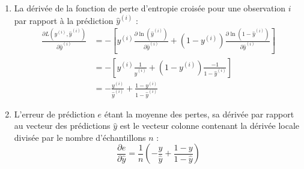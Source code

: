 \documentclass[]{../exercices}
\begin{document}
\begin{solution}
\begin{enumerate}
    \item La dérivée de la fonction de perte d'entropie croisée pour une observation $i$ par rapport à la prédiction $\hat{y}^{(i)}$ :
    \begin{align*}
        \frac{\partial L(y^{(i)}, \hat{y}^{(i)})}{\partial \hat{y}^{(i)}} &= - \left[ y^{(i)} \frac{\partial \ln(\hat{y}^{(i)})}{\partial \hat{y}^{(i)}} + (1 - y^{(i)}) \frac{\partial \ln(1 - \hat{y}^{(i)})}{\partial \hat{y}^{(i)}} \right] \\
        &= - \left[ y^{(i)} \frac{1}{\hat{y}^{(i)}} + (1 - y^{(i)}) \frac{-1}{1 - \hat{y}^{(i)}} \right] \\
        &= - \frac{y^{(i)}}{\hat{y}^{(i)}} + \frac{1 - y^{(i)}}{1 - \hat{y}^{(i)}}
    \end{align*}

    \item L'erreur de prédiction $e$ étant la moyenne des pertes, sa dérivée par rapport au vecteur des prédictions $\hat{y}$ est le vecteur colonne contenant la dérivée locale divisée par le nombre d'échantillons $n$ :
    \begin{equation*}
        \frac{\partial e}{\partial \hat{y}} = \frac{1}{n} \left( -\frac{y}{\hat{y}} + \frac{1 - y}{1 - \hat{y}} \right)
    \end{equation*}


\end{enumerate}
\end{solution}
\end{document}
